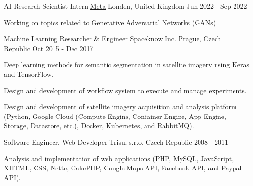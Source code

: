 

\begin{cventries}

  \cventry
    {AI Research Scientist Intern} %
    {\href{https://about.facebook.com}{Meta}} %
    {London, United Kingdom} %
    {Jun 2022 - Sep 2022} %
    {
      \begin{cvitems} %
        \item {Working on topics related to Generative Adversarial Networks (GANs)}
      \end{cvitems}
    }

\cventry
{Machine Learning Researcher \& Engineer} %
{\href{http://spaceknow.com}{Spaceknow Inc.}} %
{Prague, Czech Republic} %
{Oct 2015 - Dec 2017} %
{
	\begin{cvitems} %
		\item {Deep learning methods for semantic segmentation in satellite imagery using Keras and TensorFlow.}
		\item {Design and development of workflow system to execute and manage experiments.}
		\item {Design and development of satellite imagery acquisition and analysis platform
			(Python, Google Cloud (Compute Engine, Container Engine, App Engine, Storage, Datastore, etc.), Docker, Kubernetes, and RabbitMQ).
		}
	\end{cvitems}
}

\cventry
{Software Engineer, Web Developer} %
{Trisul s.r.o.} %
{Czech Republic} %
{2008 - 2011} %
{
	\begin{cvitems} %
		\item {Analysis and implementation of web applications (PHP, MySQL, JavaScript, XHTML, CSS, Nette, CakePHP, Google Maps API, Facebook API, and Paypal API).}
	\end{cvitems}
}


\end{cventries}
